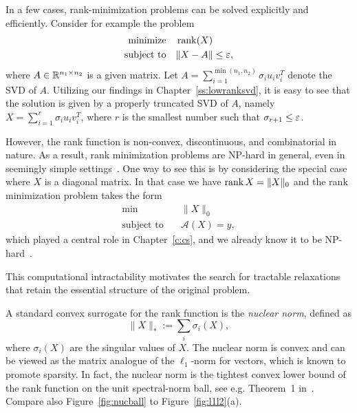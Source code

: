 In a few cases, rank-minimization problems can be solved explicitly and efficiently. Consider for example the problem
\begin{align}\label{eq:ranksvd}
\begin{split}
\text{minimize} \quad & \operatorname{rank}(X) \\
\text{subject to} \quad & \|X - A\| \le \varepsilon,
\end{split}
\end{align}
where $A \in \mathbb{R}^{n_1\times n_2}$ is a given matrix. Let $A= \sum_{i=1}^{\min(n_1,n_2)} \sigma_i u_i v_i^T$ denote the SVD of $A$. Utilizing our findings in Chapter~\ref{ss:lowranksvd}, it is easy to see that the solution is given by a properly truncated SVD of $A$, namely $X= \sum_{i=1}^{r} \sigma_i u_i v_i^T$, where $r$
is the smallest number such that $\sigma_{r+1} \le \varepsilon$.

However, the rank function is non-convex, discontinuous, and combinatorial in nature. As a result, rank minimization problems are NP-hard in general, even in seemingly simple settings~\cite{LVanderberghe_SBoyd_1996,fazel2002matrix}. 
One way to see this is by considering the special case where $X$
is a diagonal matrix. In that case we have $\operatorname{rank} X = \|X\|_0$ and the rank minimization problem takes the form
\begin{align*}
\min \quad & \|X\|_0 \\
\text{subject to} \quad & \mathcal{A}(X) = y,
\end{align*}
which played a central role in Chapter~\ref{c:cs}, and we already know it to be 
NP-hard~\cite{natarajan1995sparse,FoucartRauhut_CSbook}.



This computational intractability motivates the search for tractable relaxations that retain the essential structure of the original problem.








A standard convex surrogate for the rank function is the {\em nuclear norm}, defined as
$$
\|X\|_* := \sum_{i} \sigma_i(X),
$$
where ${\sigma_i(X)}$ are the singular values of $X$. The nuclear norm is convex and can be viewed as the matrix analogue of the $\ell_1$-norm for vectors, which is known to promote sparsity. In fact, the nuclear norm is the tightest convex lower bound of the rank function on the unit spectral-norm ball, see e.g. Theorem~1 in~\cite{fazel2001rank}. Compare also Figure~\ref{fig:nucball} to Figure~\ref{fig:l1l2}(a).

